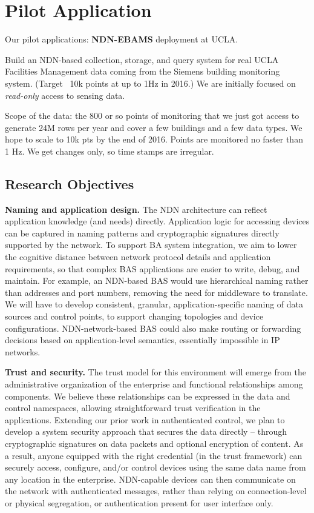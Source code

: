 \section{Pilot Application}


Our pilot applications:  \textbf{NDN-EBAMS} deployment at UCLA. 

Build an NDN-based collection, storage, and query
system for real UCLA Facilities Management data coming from the Siemens
building monitoring system. (Target ~10k points at up to 1Hz in 2016.)  We
are initially focused on \emph{read-only} access to sensing data.

Scope of the data: the 800 or so points of monitoring that we just got
access to generate 24M rows per year and cover a few buildings and a few
data types.  We hope to scale to 10k pts by the end of 2016.  Points are
monitored no faster than 1 Hz.  We get changes only, so time stamps are
irregular.

\subsection{Research Objectives} 

{\bf Naming and application design.} The NDN architecture can reflect application knowledge (and needs) directly. Application logic for accessing devices can be captured in naming patterns and cryptographic signatures directly supported by the network. To support BA system integration, we aim to lower the cognitive distance between network protocol details and application requirements, so that complex BAS applications are easier to write, debug, and maintain. For example, an NDN-based BAS would use hierarchical naming rather than addresses and port numbers, removing the need for middleware to translate.  We will have to develop
consistent, granular, application-specific naming of data sources and control points, to
support changing topologies and device configurations.  NDN-network-based BAS could also 
make routing or forwarding decisions based on application-level semantics, 
essentially impossible in IP networks.

{\bf Trust and security.} The trust model for this environment will emerge from the administrative organization of the enterprise and functional relationships among components.  We believe these relationships can be expressed in the data and control namespaces, allowing straightforward trust verification in the applications.  Extending our prior work in authenticated control, we plan to develop a system security approach that secures the data directly – through cryptographic signatures on data packets and optional encryption of content. As a result, anyone equipped with the right credential (in the trust framework) can securely access, configure, and/or control  devices using the same data name from any location in the enterprise. NDN-capable devices can then communicate on the network with authenticated messages, rather than relying on connection-level or physical segregation, or authentication present for user interface only.

